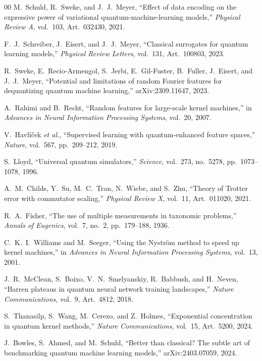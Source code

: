 \documentclass[conference]{IEEEtran}
\begin{document}
\begin{thebibliography}{00}
M.~Schuld, R.~Sweke, and J.~J.~Meyer,
``Effect of data encoding on the expressive power of variational quantum-machine-learning models,''
\textit{Physical Review A}, vol.~103, Art.~032430, 2021.

F.~J.~Schreiber, J.~Eisert, and J.~J.~Meyer,
``Classical surrogates for quantum learning models,''
\textit{Physical Review Letters}, vol.~131, Art.~100803, 2023.

R.~Sweke, E.~Recio-Armengol, S.~Jerbi, E.~Gil-Fuster, B.~Fuller, J.~Eisert, and J.~J.~Meyer,
``Potential and limitations of random Fourier features for dequantizing quantum machine learning,''
arXiv:2309.11647, 2023.

A.~Rahimi and B.~Recht,
``Random features for large-scale kernel machines,''
in \textit{Advances in Neural Information Processing Systems}, vol.~20, 2007.

V.~Havl\'{i}\v{c}ek \textit{et al.},
``Supervised learning with quantum-enhanced feature spaces,''
\textit{Nature}, vol.~567, pp.~209--212, 2019.

S.~Lloyd,
``Universal quantum simulators,''
\textit{Science}, vol.~273, no.~5278, pp.~1073--1078, 1996.

A.~M.~Childs, Y.~Su, M.~C.~Tran, N.~Wiebe, and S.~Zhu,
``Theory of Trotter error with commutator scaling,''
\textit{Physical Review X}, vol.~11, Art.~011020, 2021.

R.~A.~Fisher,
``The use of multiple measurements in taxonomic problems,''
\textit{Annals of Eugenics}, vol.~7, no.~2, pp.~179--188, 1936.

C.~K.~I.~Williams and M.~Seeger,
``Using the Nystr\"om method to speed up kernel machines,''
in \textit{Advances in Neural Information Processing Systems}, vol.~13, 2001.

J.~R.~McClean, S.~Boixo, V.~N.~Smelyanskiy, R.~Babbush, and H.~Neven,
``Barren plateaus in quantum neural network training landscapes,''
\textit{Nature Communications}, vol.~9, Art.~4812, 2018.

S.~Thanasilp, S.~Wang, M.~Cerezo, and Z.~Holmes,
``Exponential concentration in quantum kernel methods,''
\textit{Nature Communications}, vol.~15, Art.~5200, 2024.

J.~Bowles, S.~Ahmed, and M.~Schuld,
``Better than classical? The subtle art of benchmarking quantum machine learning models,''
arXiv:2403.07059, 2024.
\end{thebibliography}
\end{document}
